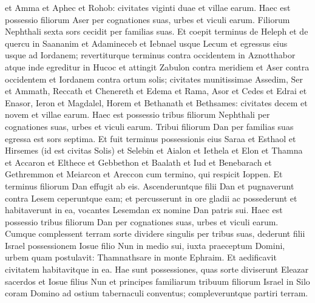 \begin{biblechapter}
\begin{biblechapter}
\begin{biblechapter}
\begin{biblechapter}
\begin{biblechapter}
\begin{biblechapter}
\begin{biblechapter}
\begin{biblechapter}
\begin{biblechapter}
\begin{biblechapter}
\begin{biblechapter}
\begin{biblechapter}
\begin{biblechapter}
\begin{biblechapter}
\begin{biblechapter}
\begin{biblechapter}
\begin{biblechapter}
\begin{biblechapter}
\begin{biblechapter}
\verse et Amma et Aphec et Rohob: civitates viginti duae et villae earum. 
\verse Haec est possessio filiorum Aser per cognationes suas, urbes et viculi earum.
 \verse Filiorum Nephthali sexta sors cecidit per familias suas. 
\verse Et coepit terminus de Heleph et de quercu in Saananim et Adamineceb et Iebnael usque Lecum et egressus eius usque ad Iordanem; 
\verse revertiturque terminus contra occidentem in Aznotthabor atque inde egreditur in Hucoc et attingit Zabulon contra meridiem et Aser contra occidentem et Iordanem contra ortum solis; 
\verse civitates munitissimae Assedim, Ser et Ammath, Reccath et Chenereth 
\verse et Edema et Rama, Asor 
\verse et Cedes et Edrai et Enasor, 
\verse Ieron et Magdalel, Horem et Bethanath et Bethsames: civitates decem et novem et villae earum. 
\verse Haec est possessio tribus filiorum Nephthali per cognationes suas, urbes et viculi earum.
 \verse Tribui filiorum Dan per familias suas egressa est sors septima. 
\verse Et fuit terminus possessionis eius Saraa et Esthaol et Hirsemes (id est civitas Solis) 
\verse et Selebin et Aialon et Iethela 
\verse et Elon et Thamna et Accaron 
 \verse et Elthece et Gebbethon et Baalath 
\verse et Iud et Benebarach et Gethremmon 
 \verse et Meiarcon et Areccon cum termino, qui respicit Ioppen. 
\verse Et terminus filiorum Dan effugit ab eis. Ascenderuntque filii Dan et pugnaverunt contra Lesem ceperuntque eam; et percusserunt in ore gladii ac possederunt et habitaverunt in ea, vocantes Lesemdan ex nomine Dan patris sui. 
\verse Haec est possessio tribus filiorum Dan per cognationes suas, urbes et viculi earum.
 \verse Cumque complessent terram sorte dividere singulis per tribus suas, dederunt filii Israel possessionem Iosue filio Nun in medio sui, 
\verse iuxta praeceptum Domini, urbem quam postulavit: Thamnathsare in monte Ephraim. Et aedificavit civitatem habitavitque in ea.
 \verse Hae sunt possessiones, quas sorte diviserunt Eleazar sacerdos et Iosue filius Nun et principes familiarum tribuum filiorum Israel in Silo coram Domino ad ostium tabernaculi conventus; compleveruntque partiri terram.
 

\end{biblechapter}
\end{biblechapter}
\end{biblechapter}
\end{biblechapter}
\end{biblechapter}
\end{biblechapter}
\end{biblechapter}
\end{biblechapter}
\end{biblechapter}
\end{biblechapter}
\end{biblechapter}
\end{biblechapter}
\end{biblechapter}
\end{biblechapter}
\end{biblechapter}
\end{biblechapter}
\end{biblechapter}
\end{biblechapter}
\end{biblechapter}
